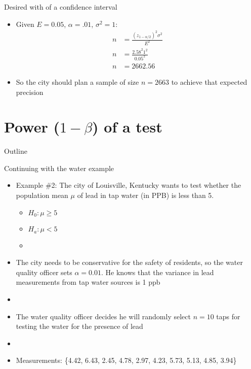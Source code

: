 \documentclass[xcolor=dvipsnames]{beamer}
\begin{document}
\begin{frame}{Desired with of a confidence interval}
\begin{itemize}
	\item Given $E = 0.05$, $\alpha = .01$, $\sigma^2 = 1$:
	\begin{align*}
		n &= \frac{(z_{1-\alpha/2})^2 \sigma^2}{E^2}\\
		n &=\frac{2.58^2 1^2}{0.05^2} \\
		n &= 2662.56
	\end{align*}
	\item So the city should plan a sample of size $n = 2663$ to achieve that expected precision
\end{itemize}
\end{frame}

\section{Power ($1-\beta$) of a test}

\begin{frame}{Outline}
	\tableofcontents[currentsection,subsectionstyle=show/shaded/hide]
\end{frame}

\begin{frame}{Continuing with the water example}
	\begin{itemize}
		\item Example \#2: The city of Louisville, Kentucky wants to test whether the population mean $\mu$ of lead in tap water (in PPB) is less than 5.
		\begin{itemize}
			\item $H_0: \mu \geq 5$
			\item $H_a: \mu < 5$
			\item[]
		\end{itemize}
		\item The city needs to be conservative for the safety of residents, so the water quality officer sets $\alpha = 0.01$. He knows that the variance in lead measurements from tap water sources is 1 ppb
		\item[]
		\item The water quality officer decides he will randomly select $n=10$ taps for testing the water for the presence of lead
		\item[]
		\item Measurements: \{4.42, 6.43, 2.45, 4.78, 2.97, 4.23, 5.73, 5.13, 4.85, 3.94\}
	\end{itemize}
\end{frame}
\end{document}
